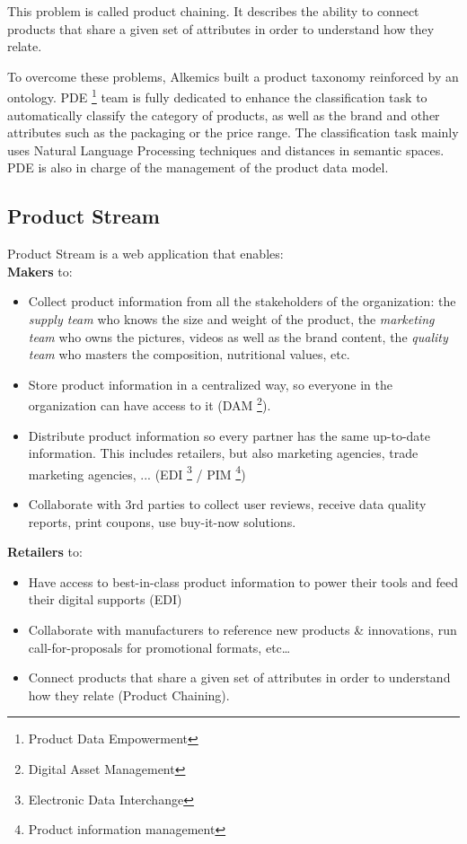 This problem is called product chaining. It describes the ability to connect products that share a given set of attributes in order to understand how they relate.

To overcome these problems, Alkemics built a product taxonomy reinforced by an ontology. PDE \footnote{Product Data Empowerment} team is fully dedicated to enhance the classification task to automatically classify the category of products, as well as the brand and other attributes such as the packaging or the price range. The classification task mainly uses Natural Language Processing techniques and distances in semantic spaces. PDE is also in charge of the management of the product data model.


\subsection{Product Stream}

Product Stream is a web application that enables:
\\

\textbf{Makers} to:
    \begin{itemize}
    \item Collect product information from all the stakeholders of the organization: the \textit{supply team} who knows the size and weight of the product, the \textit{marketing team} who owns the pictures, videos as well as the brand content, the \textit{quality team} who masters the composition, nutritional values, etc.
    \item Store product information in a centralized way, so everyone in the organization can have access to it (DAM \footnote{Digital Asset Management}).
    \item Distribute product information so every partner has the same up-to-date information. This includes retailers, but also marketing agencies, trade marketing agencies, ... (EDI \footnote{Electronic Data Interchange} / PIM \footnote{Product information management})
    \item Collaborate with 3rd parties to collect user reviews,  receive data quality reports,  print coupons, use buy-it-now solutions.
    \end{itemize}

\textbf{Retailers} to:
    \begin{itemize}
    \item Have access to best-in-class product information to power their tools and feed their digital supports (EDI)
    \item Collaborate with manufacturers to reference new products \& innovations, run call-for-proposals for promotional formats, etc…
    \item Connect products that share a given set of attributes in order to understand how they relate (Product Chaining).
    \end{itemize}

